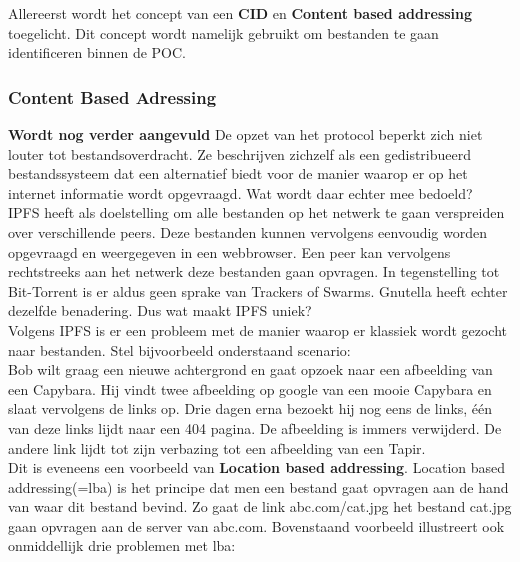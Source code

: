 Allereerst wordt het concept van een \textbf{CID} en \textbf{Content based addressing} toegelicht. Dit concept wordt namelijk gebruikt om bestanden te gaan identificeren binnen de POC. %

\subsubsection{Content Based Adressing}
\label{CBA}
\textbf{Wordt nog verder aangevuld}
 De opzet van het protocol beperkt zich niet louter tot bestandsoverdracht. Ze beschrijven zichzelf als een gedistribueerd bestandssysteem dat een alternatief biedt voor de manier waarop er op het internet informatie wordt opgevraagd. Wat wordt daar echter mee bedoeld?\\

IPFS heeft als doelstelling om alle bestanden op het netwerk te gaan verspreiden over verschillende peers. Deze bestanden kunnen vervolgens eenvoudig worden opgevraagd en weergegeven in een webbrowser. Een peer kan vervolgens rechtstreeks aan het netwerk deze bestanden gaan opvragen. In tegenstelling tot Bit-Torrent is er aldus geen sprake van Trackers of Swarms. Gnutella heeft echter dezelfde benadering. Dus wat maakt IPFS uniek?\\

Volgens IPFS is er een probleem met de manier waarop er klassiek wordt gezocht naar bestanden. Stel bijvoorbeeld onderstaand scenario:\\

Bob wilt graag een nieuwe achtergrond en gaat opzoek naar een afbeelding van een Capybara. Hij vindt twee afbeelding op google van een mooie Capybara en slaat vervolgens de links op. Drie dagen erna bezoekt hij nog eens de links, één van deze links lijdt naar een 404 pagina. De afbeelding is immers verwijderd. De andere link lijdt tot zijn verbazing tot een afbeelding van een Tapir.\\

Dit is eveneens een voorbeeld van \textbf{Location based addressing}. Location based addressing(=lba) is het principe dat men een bestand gaat opvragen aan de hand van waar dit bestand bevind. Zo gaat de link abc.com/cat.jpg het bestand cat.jpg gaan opvragen aan de server van abc.com. Bovenstaand voorbeeld illustreert ook onmiddellijk drie problemen met lba:

